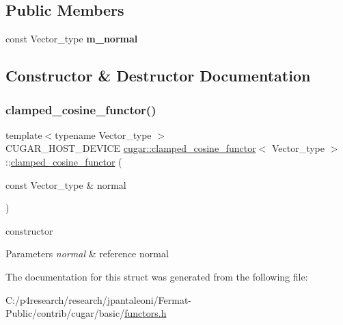 \subsection*{Public Members}
\begin{DoxyCompactItemize}
\item 
\mbox{\label{structcugar_1_1clamped__cosine__functor_ac5c35f5c1be6302bd56694f50ae4fbff}} 
const Vector\+\_\+type {\bfseries m\+\_\+normal}
\end{DoxyCompactItemize}


\subsection{Constructor \& Destructor Documentation}
\mbox{\label{structcugar_1_1clamped__cosine__functor_a24f2ce1992a26dc465f5167742b76207}} 
\subsubsection{\texorpdfstring{clamped\+\_\+cosine\+\_\+functor()}{clamped\_cosine\_functor()}}
{\footnotesize\ttfamily template$<$typename Vector\+\_\+type $>$ \\
C\+U\+G\+A\+R\+\_\+\+H\+O\+S\+T\+\_\+\+D\+E\+V\+I\+CE \hyperlink{structcugar_1_1clamped__cosine__functor}{cugar\+::clamped\+\_\+cosine\+\_\+functor}$<$ Vector\+\_\+type $>$\+::\hyperlink{structcugar_1_1clamped__cosine__functor}{clamped\+\_\+cosine\+\_\+functor} (\begin{DoxyParamCaption}\item[{const Vector\+\_\+type \&}]{normal }\end{DoxyParamCaption})\hspace{0.3cm}{\ttfamily [inline]}}

constructor


\begin{DoxyParams}{Parameters}
{\em normal} & reference normal \\
\hline
\end{DoxyParams}


The documentation for this struct was generated from the following file\+:\begin{DoxyCompactItemize}
\item 
C\+:/p4research/research/jpantaleoni/\+Fermat-\/\+Public/contrib/cugar/basic/\hyperlink{functors_8h}{functors.\+h}\end{DoxyCompactItemize}
